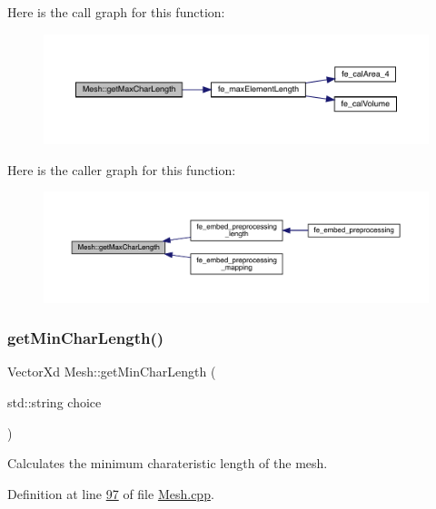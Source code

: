 Here is the call graph for this function\+:\nopagebreak
\begin{figure}[H]
\begin{center}
\leavevmode
\includegraphics[width=350pt]{class_mesh_a72d2a3863b85a2a2aed7deca8ce37832_cgraph}
\end{center}
\end{figure}
Here is the caller graph for this function\+:\nopagebreak
\begin{figure}[H]
\begin{center}
\leavevmode
\includegraphics[width=350pt]{class_mesh_a72d2a3863b85a2a2aed7deca8ce37832_icgraph}
\end{center}
\end{figure}
\mbox{\label{class_mesh_a94ce58cb2598b1db2973ad357dae2710}} 
\subsubsection{\texorpdfstring{get\+Min\+Char\+Length()}{getMinCharLength()}}
{\footnotesize\ttfamily Vector\+Xd Mesh\+::get\+Min\+Char\+Length (\begin{DoxyParamCaption}\item[{std\+::string}]{choice }\end{DoxyParamCaption})}



Calculates the minimum charateristic length of the mesh. 



Definition at line \hyperlink{_mesh_8cpp_source_l00097}{97} of file \hyperlink{_mesh_8cpp_source}{Mesh.\+cpp}.

